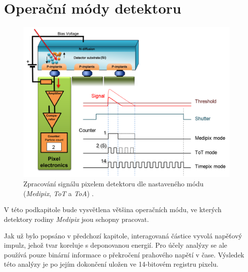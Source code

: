 \section{Operační módy detektoru}\label{chap:detectors:operation_modes}
\begin{figure}[th]
	\begin{center}
		\includegraphics[width=14cm]{figures/det_pix.png}
		\caption{Zpracování signálu pixelem detektoru dle nastaveného módu (\textit{Medipix}, \textit{ToT} a \textit{ToA}) \cite{PlatkevicDisertace}.}
		\label{fig:det:modes}
	\end{center}
\end{figure}


V této podkapitole bude vysvětlena většina operačních módu, ve kterých detektory rodiny \textit{Medipix} jsou schopny pracovat. 

Jak už bylo popsáno v předchozí kapitole, interagovaná částice vyvolá napěťový impulz, jehož tvar koreluje s deponovanou energií. Pro účely analýzy se ale používá pouze binární informace o překročení prahového napětí v čase. Výsledek této analýzy je po jejím dokončení uložen ve 14-bitovém registru pixelu.

